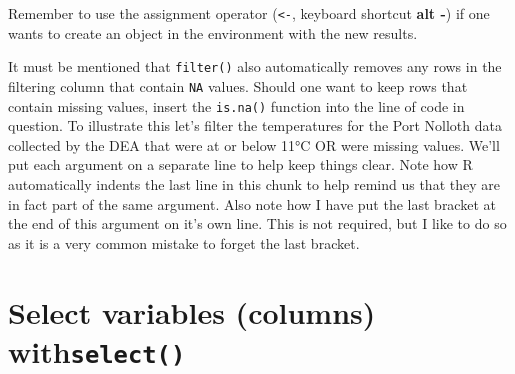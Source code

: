 \documentclass[]{book}
\newenvironment{Shaded}{\begin{snugshade}}{\end{snugshade}}
\newcommand{\KeywordTok}[1]{\textcolor[rgb]{0.13,0.29,0.53}{\textbf{#1}}}
\newcommand{\DecValTok}[1]{\textcolor[rgb]{0.00,0.00,0.81}{#1}}
\newcommand{\StringTok}[1]{\textcolor[rgb]{0.31,0.60,0.02}{#1}}
\newcommand{\CommentTok}[1]{\textcolor[rgb]{0.56,0.35,0.01}{\textit{#1}}}
\newcommand{\OperatorTok}[1]{\textcolor[rgb]{0.81,0.36,0.00}{\textbf{#1}}}
\newcommand{\NormalTok}[1]{#1}
\theoremstyle{definition}
\theoremstyle{definition}
\theoremstyle{definition}
\theoremstyle{remark}
\begin{document}
Remember to use the assignment operator (\texttt{\textless{}-}, keyboard
shortcut \textbf{alt -}) if one wants to create an object in the
environment with the new results.

\begin{Shaded}
\end{Shaded}

It must be mentioned that \texttt{filter()} also automatically removes
any rows in the filtering column that contain \texttt{NA} values. Should
one want to keep rows that contain missing values, insert the
\texttt{is.na()} function into the line of code in question. To
illustrate this let's filter the temperatures for the Port Nolloth data
collected by the DEA that were at or below 11°C OR were missing values.
We'll put each argument on a separate line to help keep things clear.
Note how R automatically indents the last line in this chunk to help
remind us that they are in fact part of the same argument. Also note how
I have put the last bracket at the end of this argument on it's own
line. This is not required, but I like to do so as it is a very common
mistake to forget the last bracket.

\begin{Shaded}
\end{Shaded}

\section{\texorpdfstring{Select variables (columns)
with\texttt{select()}}{Select variables (columns) withselect()}}\label{select-variables-columns-withselect}
\end{document}
